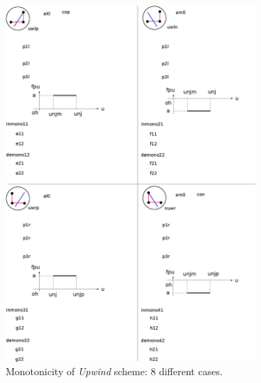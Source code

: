 \begin{figure}[ht]
	\includegraphics[width=0.83\textwidth]{monotoneUW.eps}
	\caption{Monotonicity of \emph{Upwind} scheme: 8 different cases.}
	\label{\LABEL}
\end{figure}